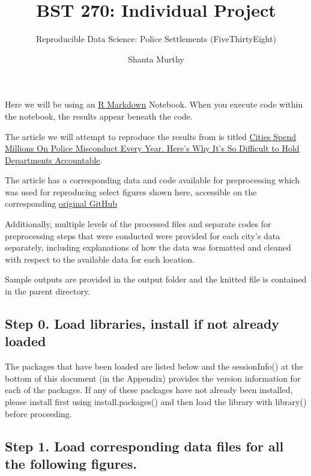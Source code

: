 \documentclass[
  letterpaper,
  DIV=11,
  numbers=noendperiod]{scrartcl}
\title{BST 270: Individual Project}
\subtitle{Reproducible Data Science: Police Settlements
(FiveThirtyEight)}
\author{Shanta Murthy}
\date{}
\begin{document}
\maketitle


Here we will be using an \href{http://rmarkdown.rstudio.com}{R Markdown}
Notebook. When you execute code within the notebook, the results appear
beneath the code.

The article we will attempt to reproduce the results from is titled
\href{'\%20https://fivethirtyeight.com/features/police-misconduct-costs-cities-millions-every-year-but-thats-where-the-accountability-ends/'}{Cities
Spend Millions On Police Misconduct Every Year. Here's Why It's So
Difficult to Hold Departments Accountable}.

The article has a corresponding data and code available for
preprocessing which was used for reproducing select figures shown here,
accessible on the corresponding
\href{'https://github.com/fivethirtyeight/police-settlements/'}{original
GitHub}

Additionally, multiple levels of the processed files and separate codes
for preprocessing steps that were conducted were provided for each
city's data separately, including explanations of how the data was
formatted and cleaned with respect to the available data for each
location.

Sample outputs are provided in the output folder and the knitted file is
contained in the parent directory.

\subsection{Step 0. Load libraries, install if not already
loaded}\label{step-0.-load-libraries-install-if-not-already-loaded}

The packages that have been loaded are listed below and the
sessionInfo() at the bottom of this document (in the Appendix) provides
the version information for each of the packages. If any of these
packages have not already been installed, please install first using
install.packages() and then load the library with library() before
proceeding.

\subsection{Step 1. Load corresponding data files for all the following
figures.}\label{step-1.-load-corresponding-data-files-for-all-the-following-figures.}
\end{document}
